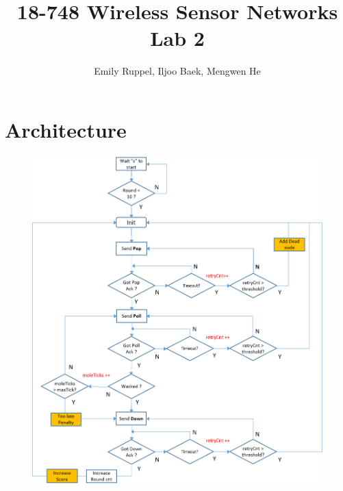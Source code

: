\documentclass[letterpaper, 10pt]{article}
\title{\textbf{18-748 Wireless Sensor Networks Lab 2}}
\author{Emily Ruppel, Iljoo Baek, Mengwen He}
\begin{document}
	\maketitle
	
\section{Architecture}

\begin{figure}[!h]
	\centering
	\includegraphics[width=15cm]{./frame.png}
\end{figure}
	
\end{document}
